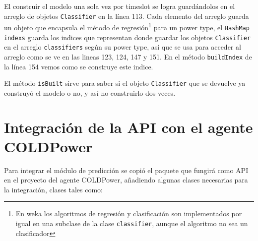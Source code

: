 El construir el modelo una sola vez por timeslot se logra guardándolos en el arreglo de objetos \texttt{Classifier} en la línea 113. Cada elemento del arreglo guarda un objeto que encapsula el método de regresión\footnote{En weka los algoritmos de regresión y clasificación son implementados por igual en una subclase de la clase \texttt{classifier}, aunque el algoritmo no sea un clasificador} para un power type, el \texttt{HashMap indexs} guarda los indices que representan donde guardar los objetos \texttt{Classifier} en el arreglo \texttt{classifiers} según su power type, así que se usa para acceder al arreglo como se ve en las lineas 123, 124, 147 y 151. En el método \texttt{buildIndex} de la línea 154 vemos como se construye este indice.

El método \texttt{isBuilt} sirve para saber si el objeto \texttt{Classifier} que se devuelve ya construyó el modelo o no, y así no construirlo dos veces.

\section{Integración de la API con el agente COLDPower} \label{sec:integracionAPI}

Para integrar el módulo de predicción  %
se copió el paquete que fungirá como API en el proyecto del agente COLDPower, añadiendo algunas clases necesarias para la integración, clases tales como:

